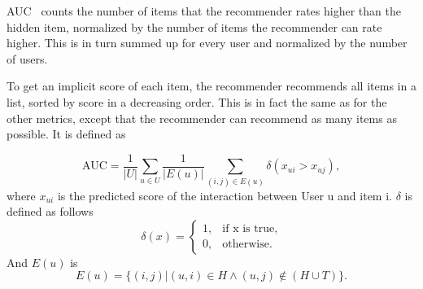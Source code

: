 AUC~\cite{Rendle:2009:BBP:1795114.1795167} counts the number of items that the recommender rates
higher than the hidden item, normalized by the number of items the
recommender can rate higher. This is in turn summed up for every user and 
normalized by the number of users.

To get an implicit score of each item, the recommender recommends all
items in a list, sorted by score in a decreasing order. This is in fact the same
as for the other metrics, except that the recommender can recommend as
many items as possible. It is defined as

\begin{equation}
\text{AUC}=\frac{1}{|U|}\sum_{u \in U} \frac{1}{|E(u)|} \sum_{(i,j) \in E(u)} \delta(x_{ui}>x_{uj}),
\end{equation}
where \(x_{ui}\) is the predicted score of the interaction between User u and item i.
\(\delta\) is defined as follows
\begin{equation}
\delta(x)=\begin{cases}1, & \text{if x is true}, \\
                       0, & \text{otherwise.}
\end{cases}
\end{equation}
And \(E(u)\) is 
\begin{equation}
E(u) =\{(i,j)|(u,i) \in H \land (u,j) \not\in (H \cup T)\}.
\end{equation}


%




